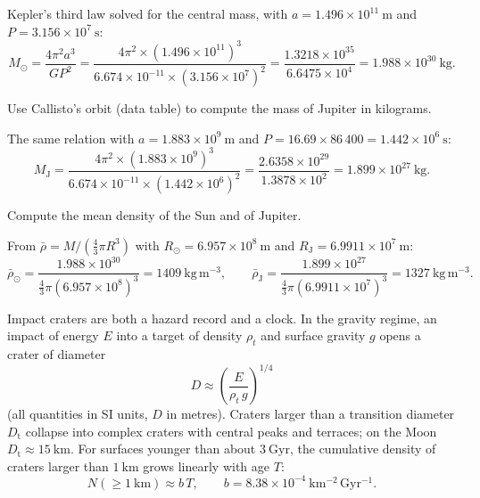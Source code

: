 \begin{solution}
Kepler's third law solved for the central mass, with $a = 1.496 \times 10^{11}\ \mathrm{m}$ and $P = 3.156 \times 10^{7}\ \mathrm{s}$:
\[
  M_\odot = \frac{4\pi^2 a^3}{G P^2}
          = \frac{4\pi^2 \times (1.496 \times 10^{11})^3}{6.674 \times 10^{-11} \times (3.156 \times 10^{7})^2}
          = \frac{1.3218 \times 10^{35}}{6.6475 \times 10^{4}}
          = 1.988 \times 10^{30}\ \mathrm{kg}.
\]
\end{solution}

\parti {} Use Callisto's orbit (data table) to compute the mass of Jupiter in kilograms.

\begin{solution}
The same relation with $a = 1.883 \times 10^{9}\ \mathrm{m}$ and $P = 16.69 \times 86\,400 = 1.442 \times 10^{6}\ \mathrm{s}$:
\[
  M_{\mathrm{J}} = \frac{4\pi^2 \times (1.883 \times 10^{9})^3}{6.674 \times 10^{-11} \times (1.442 \times 10^{6})^2}
                 = \frac{2.6358 \times 10^{29}}{1.3878 \times 10^{2}}
                 = 1.899 \times 10^{27}\ \mathrm{kg}.
\]
\end{solution}

\parti {} Compute the mean density of the Sun and of Jupiter.

\begin{solution}
From $\bar{\rho} = M / (\tfrac{4}{3}\pi R^3)$ with $R_\odot = 6.957 \times 10^{8}\ \mathrm{m}$ and $R_{\mathrm{J}} = 6.9911 \times 10^{7}\ \mathrm{m}$:
\[
  \bar{\rho}_\odot = \frac{1.988 \times 10^{30}}{\tfrac{4}{3}\pi (6.957 \times 10^{8})^3} = 1409\ \mathrm{kg\,m^{-3}},
  \qquad
  \bar{\rho}_{\mathrm{J}} = \frac{1.899 \times 10^{27}}{\tfrac{4}{3}\pi (6.9911 \times 10^{7})^3} = 1327\ \mathrm{kg\,m^{-3}}.
\]
\end{solution}



Impact craters are both a hazard record and a clock.
In the gravity regime, an impact of energy $E$ into a target of density $\rho_t$ and surface gravity $g$ opens a crater of diameter
\[
  D \approx \left( \frac{E}{\rho_t\, g} \right)^{1/4}
\]
(all quantities in SI units, $D$ in metres).
Craters larger than a transition diameter $D_{\mathrm{t}}$ collapse into complex craters with central peaks and terraces; on the Moon $D_{\mathrm{t}} \approx 15\ \mathrm{km}$.
For surfaces younger than about $3\ \mathrm{Gyr}$, the cumulative density of craters larger than $1\ \mathrm{km}$ grows linearly with age $T$:
\[
  N(\geq 1\ \mathrm{km}) \approx b\,T, \qquad b = 8.38 \times 10^{-4}\ \mathrm{km^{-2}\,Gyr^{-1}}.
\]

